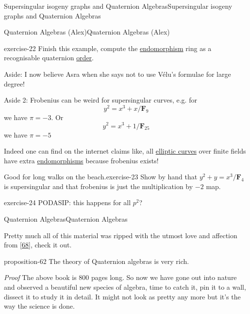 \documentclass[10pt,]{book}
\makeatletter
\renewcommand*{\proofname}{Proof}
\renewenvironment{proof}[1][\proofname]{\par
  \pushQED{\qed}%
  \normalfont \topsep6\p@\@plus6\p@\relax
  \trivlist
  \item\relax
    {\itshape
    #1\@addpunct{.}}\hspace\labelsep\ignorespaces
}{%
  \popQED\endtrivlist\@endpefalse
}
\numberwithin{equation}{section}
\newcommand{\FF}{\mathbf{F}}
\makeatother
\begin{document}
\begin{chapterptx}{Supersingular isogeny graphs and Quaternion Algebras}{}{Supersingular isogeny graphs and Quaternion Algebras}{}{}
\begin{sectionptx}{Quaternion Algebras (Alex)}{}{Quaternion Algebras (Alex)}{}{}
\begin{introduction}{}
\begin{inlineexercise}{}{exercise-22}
Finish this example, compute the \hyperref[def-supersing-isog-endo]{endomorphism} ring as a recognisable quaternion \hyperref[def-order-quaternion]{order}.%
\end{inlineexercise}
\hypertarget{p-878}{}%
Aside: I now believe Asra when she says not to use Vélu's formulae for large degree!%
\par
\hypertarget{p-879}{}%
Aside 2: Frobenius can be weird for supersingular curves, e.g. for%
\begin{equation*}
y^2 = x^{3} + x/\FF_9
\end{equation*}
we have \(\pi = -3\). Or%
\begin{equation*}
y^2 = x^{3} + 1/\FF_{25}
\end{equation*}
we have \(\pi = -5\)%
\par
\hypertarget{p-880}{}%
Indeed one can find on the internet claims like, all \hyperref[def-supersing-isog-ec]{elliptic curves} over finite fields have extra \hyperref[def-supersing-isog-endo]{endomorphisms} because frobenius exists!%
\begin{inlineexercise}{Good for long walks on the beach.}{exercise-23}%
\hypertarget{p-881}{}%
Show by hand that \(y^2 + y = x^3/\FF_4\) is supersingular and that frobenius is just the multiplication by \(-2\) map.%
\end{inlineexercise}
\begin{inlineexercise}{}{exercise-24}%
\hypertarget{p-882}{}%
PODASIP: this happens for all \(p^2\)?%
\end{inlineexercise}
\end{introduction}%
%
%
\typeout{************************************************}
\typeout{************************************************}
%
\begin{subsectionptx}{Quaternion Algebras}{}{Quaternion Algebras}{}{}\label{subsection-74}
\begin{introduction}{}%
\hypertarget{p-883}{}%
Pretty much all of this material was ripped with the utmost love and affection from \hyperlink{bib-voight-quat}{[68]}, check it out.%
\begin{proposition}{}{}{proposition-62}%
\hypertarget{p-884}{}%
The theory of Quaternion algebras is very rich.%
\end{proposition}
\begin{proof}\hypertarget{proof-105}{}
\hypertarget{p-885}{}%
The above book is 800 pages long.%
\end{proof}
\hypertarget{p-886}{}%
So now we have gone out into nature and observed a beautiful new species of algebra, time to catch it, pin it to a wall, dissect it to study it in detail. It might not look as pretty any more but it's the way the science is done.%

\end{introduction}
\end{subsectionptx}
\end{sectionptx}
\end{chapterptx}
\end{document}
